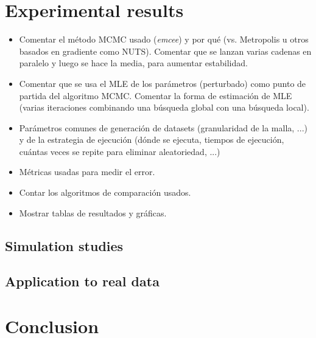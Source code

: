 \documentclass[ba]{imsart}
\numberwithin{equation}{section}
\theoremstyle{plain}
\newenvironment{comment}
{
\noindent \em \color{red}
}
{
\color{black}
}
\begin{document}
\section{Experimental results}\label{sec:results}
\begin{comment}
  \begin{itemize}
    \item Comentar el método MCMC usado (\textit{emcee}) y por qué (vs. Metropolis u otros basados en gradiente como NUTS). Comentar que se lanzan varias cadenas en paralelo y luego se hace la media, para aumentar estabilidad.
    \item Comentar que se usa el MLE de los parámetros (perturbado) como punto de partida del algoritmo MCMC. Comentar la forma de estimación de MLE (varias iteraciones combinando una búsqueda global con una búsqueda local).
    \item Parámetros comunes de generación de datasets (granularidad de la malla, ...) y de la estrategia de ejecución (dónde se ejecuta, tiempos de ejecución, cuántas veces se repite para eliminar aleatoriedad, ...)
    \item Métricas usadas para medir el error.
    \item Contar los algoritmos de comparación usados.
    \item Mostrar tablas de resultados y gráficas.
\end{itemize}
\end{comment}

\subsection{Simulation studies}

\subsection{Application to real data}

\section{Conclusion}\label{sec:conclusion}
\end{document}

